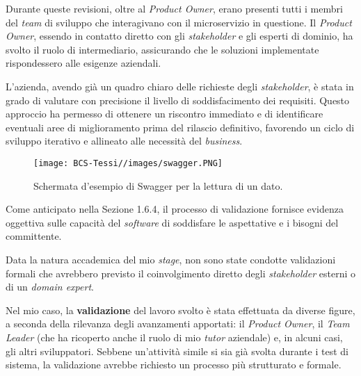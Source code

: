         \vspace{0.2 em}
        \noindent Durante queste revisioni, oltre al \textit{Product Owner}, erano presenti tutti i membri del \textit{team} di sviluppo che interagivano con il microservizio in questione. Il \textit{Product Owner}, essendo in contatto diretto con gli \textit{stakeholder} e gli esperti di dominio, ha svolto il ruolo di intermediario, assicurando che le soluzioni implementate rispondessero alle esigenze aziendali.

        \vspace{0.2 em}
        \noindent L'azienda, avendo già un quadro chiaro delle richieste degli \textit{stakeholder}, è stata in grado di valutare con precisione il livello di soddisfacimento dei requisiti. Questo approccio ha permesso di ottenere un riscontro immediato e di identificare eventuali aree di miglioramento prima del rilascio definitivo, favorendo un ciclo di sviluppo iterativo e allineato alle necessità del \textit{business}.
        
        \begin{figure}[H]
            \centering
            \texttt{[image: BCS-Tessi//images/swagger.PNG]}
            \caption{Schermata d'esempio di Swagger per la lettura di un dato.}
            \label{fig:swagger}
        \end{figure}

        \vspace{0.2 em}
        \noindent Come anticipato nella Sezione 1.6.4, il processo di validazione fornisce evidenza oggettiva sulle capacità del \textit{software} di soddisfare le aspettative e i bisogni del committente. 

        \vspace{0.2 em}
        \noindent Data la natura accademica del mio \textit{stage}, non sono state condotte validazioni formali che avrebbero previsto il coinvolgimento diretto degli \textit{stakeholder} esterni o di un \textit{domain expert}.  

        \vspace{0.2 em}
        \noindent Nel mio caso, la \textbf{validazione} del lavoro svolto è stata effettuata da diverse figure, a seconda della rilevanza degli avanzamenti apportati: il \textit{Product Owner}, il \textit{Team Leader} (che ha ricoperto anche il ruolo di mio \textit{tutor} aziendale) e, in alcuni casi, gli altri sviluppatori. Sebbene un’attività simile si sia già svolta durante i test di sistema, la validazione avrebbe richiesto un processo più strutturato e formale.  

